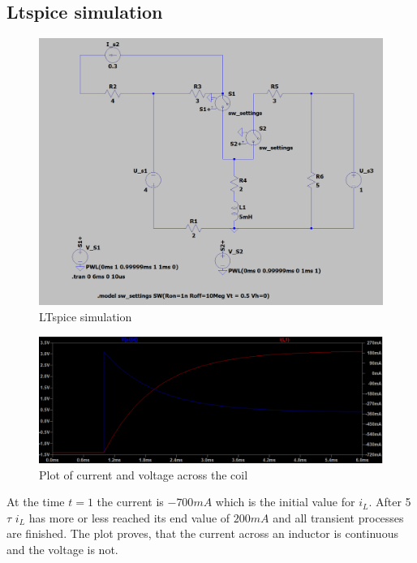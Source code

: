 \documentclass[a4paper]{article}
\begin{document}
\subsection{Ltspice simulation}
\begin{figure}[h!]\centering
   \includegraphics[scale = 0.5]{Figures/LTspice_simulation.PNG}
   \caption{LTspice simulation}
\end{figure}
\begin{figure}[h!]\centering
   \includegraphics[scale = 0.5]{Figures/Plot.PNG}
   \caption{Plot of current and voltage across the coil}
\end{figure}
At the time $t=1$ the current is $-700mA$ which is the initial value for $i_L$. After 5 $\tau$ $i_L$ has more or less reached its end
value of $200mA$ and all transient processes are finished. The plot proves, that the current across an inductor is continuous and the voltage is not.
\end{document}
